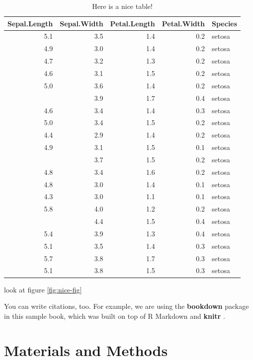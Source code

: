 \documentclass[
  12pt,
]{book}
\begin{document}
\begin{table}

\caption{\label{tab:nice-tab}Here is a nice table!}
\centering
\begin{tabular}[t]{rrrrl}
\toprule
Sepal.Length & Sepal.Width & Petal.Length & Petal.Width & Species\\
\midrule
5.1 & 3.5 & 1.4 & 0.2 & setosa\\
4.9 & 3.0 & 1.4 & 0.2 & setosa\\
4.7 & 3.2 & 1.3 & 0.2 & setosa\\
4.6 & 3.1 & 1.5 & 0.2 & setosa\\
5.0 & 3.6 & 1.4 & 0.2 & setosa\\
\addlinespace
5.4 & 3.9 & 1.7 & 0.4 & setosa\\
4.6 & 3.4 & 1.4 & 0.3 & setosa\\
5.0 & 3.4 & 1.5 & 0.2 & setosa\\
4.4 & 2.9 & 1.4 & 0.2 & setosa\\
4.9 & 3.1 & 1.5 & 0.1 & setosa\\
\addlinespace
5.4 & 3.7 & 1.5 & 0.2 & setosa\\
4.8 & 3.4 & 1.6 & 0.2 & setosa\\
4.8 & 3.0 & 1.4 & 0.1 & setosa\\
4.3 & 3.0 & 1.1 & 0.1 & setosa\\
5.8 & 4.0 & 1.2 & 0.2 & setosa\\
\addlinespace
5.7 & 4.4 & 1.5 & 0.4 & setosa\\
5.4 & 3.9 & 1.3 & 0.4 & setosa\\
5.1 & 3.5 & 1.4 & 0.3 & setosa\\
5.7 & 3.8 & 1.7 & 0.3 & setosa\\
5.1 & 3.8 & 1.5 & 0.3 & setosa\\
\bottomrule
\end{tabular}
\end{table}

look at figure \ref{fig:nice-fig}

You can write citations, too. For example, we are using the \textbf{bookdown} package \citep{R-bookdown} in this sample book, which was built on top of R Markdown and \textbf{knitr} \citep{xie2015}.

\hypertarget{materials-and-methods}{%
\chapter{Materials and Methods}\label{materials-and-methods}}
\end{document}
